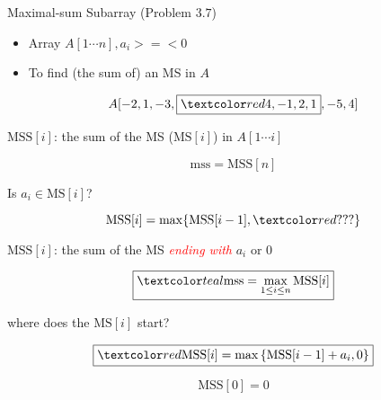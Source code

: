 
\begin{frame}{}
  \begin{exampleblock}{Maximal-sum Subarray (Problem $3.7$)}
    \begin{itemize}
      \item Array $A[1 \cdots n], a_{i} >=< 0$
      \item To find (the sum of) an MS in $A$
    \end{itemize}
	
    \[
      A[-2,1 ,-3, \boxed{\red{4,-1,2,1}} ,-5,4]
    \]
  \end{exampleblock}
\end{frame}

\begin{frame}{}
  \centerline{$\text{MSS}[i]$: the sum of the MS ($\text{MS}[i]$) in $A[1 \cdots i]$}

  \pause
  \vspace{0.30cm}
  \[
    \text{mss} = \text{MSS}[n]
  \]

  \pause
  \vspace{0.60cm}
  \centerline{ Is $a_{i} \in \text{MS}[i]$?}
  
  \pause
  \vspace{0.30cm}
  \[ 
    \text{MSS}[i] = \max \set{\text{MSS}[i-1], \red{???}}
  \]
\end{frame}

\begin{frame}{}
  \centerline{$\text{MSS}[i]$: the sum of the MS \textcolor{red}{\it ending with} $a_{i}$ or 0}

  \pause
  \vspace{0.30cm}
  \[
    \boxed{\teal{\text{mss} = \max\limits_{1 \le i \le n} \text{MSS}[i]}}
  \]

  \vspace{0.60cm}
  \centerline{ where does the $\text{MS}[i]$ start?}

  \pause
  \vspace{0.30cm}
  \[ 
    \boxed{\red{\text{MSS}[i] = \max \left\{\text{MSS}[i-1] + a_{i}, 0\right\}}}
  \]

  \pause
  \vspace{0.30cm}
  \[
    \text{MSS}[0] = 0
  \]

\end{frame}

